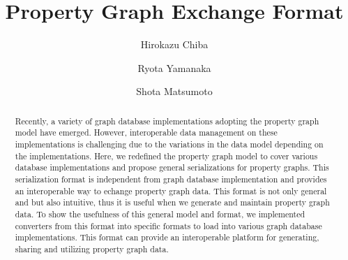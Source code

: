 \documentclass[runningheads]{llncs}
\begin{document}
\newtheorem{defi}[theorem]{Definition}
%
\title{Property Graph Exchange Format}
%
%
\author{Hirokazu Chiba \and Ryota Yamanaka \and Shota Matsumoto}
%
%
%
\maketitle              %
%
\begin{abstract}
Recently, a variety of graph database implementations adopting the property graph model have emerged.
However, interoperable data management on these implementations is challenging due to the variations in the data model depending on the implementations.
Here, we redefined the property graph model to cover various database implementations and propose general serializations for property graphs. 
This serialization format is independent from graph database implementation and provides an interoperable way to echange property graph data. This format is not only general and but also intuitive, thus it is useful when we generate and maintain property graph data. To show the usefulness of this general model and format, we implemented converters from this format into specific formats to load into various graph database implementations. This format can provide an interoperable platform for generating, sharing and utilizing property graph data.
\end{abstract}
\end{document}
